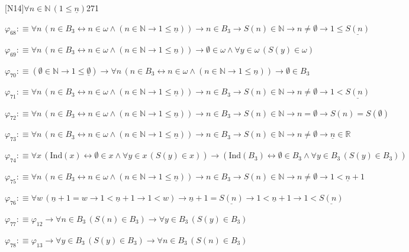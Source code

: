\begin{fullproof}{[N14]}{$\forall n \in \mathbb{N}\,(1 \leq \underline{n})$}{271}
\begin{abbrevlist}
\item $\varphi_{68} :\equiv \forall n\,(n \in B_{3} \leftrightarrow n \in \omega \land (n \in \mathbb{N} \to 1 \leq \underline{n})) \to n \in B_{3} \to S(n) \in \mathbb{N} \to n \neq \emptyset \to 1 \leq \underline{S(n)}$
\item $\varphi_{69} :\equiv \forall n\,(n \in B_{3} \leftrightarrow n \in \omega \land (n \in \mathbb{N} \to 1 \leq \underline{n})) \to \emptyset \in \omega \land \forall y \in \omega\,(S(y) \in \omega)$
\item $\varphi_{70} :\equiv (\emptyset \in \mathbb{N} \to 1 \leq \underline{\emptyset}) \to \forall n\,(n \in B_{3} \leftrightarrow n \in \omega \land (n \in \mathbb{N} \to 1 \leq \underline{n})) \to \emptyset \in B_{3}$
\item $\varphi_{71} :\equiv \forall n\,(n \in B_{3} \leftrightarrow n \in \omega \land (n \in \mathbb{N} \to 1 \leq \underline{n})) \to n \in B_{3} \to S(n) \in \mathbb{N} \to n \neq \emptyset \to 1 < \underline{S(n)}$
\item $\varphi_{72} :\equiv \forall n\,(n \in B_{3} \leftrightarrow n \in \omega \land (n \in \mathbb{N} \to 1 \leq \underline{n})) \to n \in B_{3} \to S(n) \in \mathbb{N} \to n = \emptyset \to S(n) = S(\emptyset)$
\item $\varphi_{73} :\equiv \forall n\,(n \in B_{3} \leftrightarrow n \in \omega \land (n \in \mathbb{N} \to 1 \leq \underline{n})) \to n \in B_{3} \to S(n) \in \mathbb{N} \to n \neq \emptyset \to \underline{n} \in \mathbb{R}$
\item $\varphi_{74} :\equiv \forall x\,(\mathrm{Ind}(x) \leftrightarrow \emptyset \in x \land \forall y \in x\,(S(y) \in x)) \to (\mathrm{Ind}(B_{3}) \leftrightarrow \emptyset \in B_{3} \land \forall y \in B_{3}\,(S(y) \in B_{3}))$
\item $\varphi_{75} :\equiv \forall n\,(n \in B_{3} \leftrightarrow n \in \omega \land (n \in \mathbb{N} \to 1 \leq \underline{n})) \to n \in B_{3} \to S(n) \in \mathbb{N} \to n \neq \emptyset \to 1 < \underline{n} + 1$
\item $\varphi_{76} :\equiv \forall w\,(\underline{n} + 1 = w \to 1 < \underline{n} + 1 \to 1 < w) \to \underline{n} + 1 = \underline{S(n)} \to 1 < \underline{n} + 1 \to 1 < \underline{S(n)}$
\item $\varphi_{77} :\equiv \varphi_{12} \to \forall n \in B_{3}\,(S(n) \in B_{3}) \to \forall y \in B_{3}\,(S(y) \in B_{3})$
\item $\varphi_{78} :\equiv \varphi_{13} \to \forall y \in B_{3}\,(S(y) \in B_{3}) \to \forall n \in B_{3}\,(S(n) \in B_{3})$

\end{abbrevlist}
\end{fullproof}
